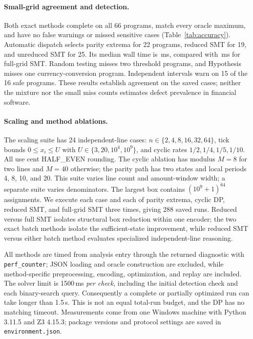 \paragraph{Small-grid agreement and detection.}
\begin{table}[ht]
\centering
\caption{Effectiveness on 66 programs: 50 sensitive and 16 safe. FP (false positive) counts warnings on oracle-safe programs; Missed counts oracle-sensitive programs without a reported witness or warning. A testing miss is not a false proof of safety. Exact-method maxima also agree with the exhaustive oracle. Median wall times are across programs.}
\label{tab:accuracy}
\end{table}
Both exact methods complete on all 66 programs, match every oracle maximum, and have no false warnings or missed sensitive cases (Table~\ref{tab:accuracy}). Automatic dispatch selects parity extrema for 22 programs, reduced SMT for 19, and unreduced SMT for 25. Its median wall time is \AutoMedian\,ms, compared with \SMTMedian\,ms for full-grid SMT. Random testing misses two threshold programs, and Hypothesis misses one currency-conversion program. Independent intervals warn on 15 of the 16 safe programs. These results establish agreement on the saved cases; neither the mixture nor the small miss counts estimates defect prevalence in financial software.

\paragraph{Scaling and method ablations.}
The scaling suite has 24 independent-line cases: $n\in\{2,4,8,16,32,64\}$, tick bounds $0\le x_i\le U$ with $U\in\{3,20,10^4,10^9\}$, and cyclic rates $1/2,1/4,1/5,1/10$. All use cent HALF\_EVEN rounding. The cyclic ablation has modulus $M=8$ for two lines and $M=40$ otherwise; the parity path has two states and local periods 4, 8, 10, and 20. This suite varies line count and amount-window width; a separate suite varies denominators. The largest box contains $(10^9+1)^{64}$ assignments. We execute each case and each of parity extrema, cyclic DP, reduced SMT, and full-grid SMT three times, giving 288 saved runs. Reduced versus full SMT isolates structural box reduction within one encoder; the two exact batch methods isolate the sufficient-state improvement, while reduced SMT versus either batch method evaluates specialized independent-line reasoning.

All methods are timed from analysis entry through the returned diagnostic with \texttt{perf\_counter}; JSON loading and oracle construction are excluded, while method-specific preprocessing, encoding, optimization, and replay are included. The solver limit is 1500\,ms \emph{per check}, including the initial detection check and each binary-search query. Consequently a complete or partially optimized run can take longer than 1.5\,s. This is not an equal total-run budget, and the DP has no matching timeout. Measurements come from one Windows machine with Python 3.11.5 and Z3 4.15.3; package versions and protocol settings are saved in \texttt{environment.json}.

